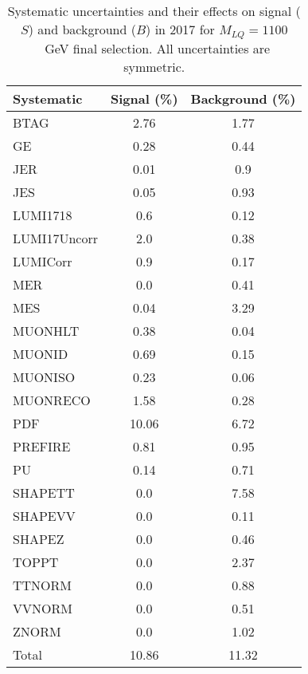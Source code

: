 \begin{table}[htbp]
\begin{center}
\caption{Systematic uncertainties and their effects on signal ($S$) and background ($B$) in 2017 for $M_{LQ}=1100$~GeV final selection. All uncertainties are symmetric.}
\begin{tabular}{lcc}
\hline\hline
Systematic & Signal (\%) & Background (\%) \\ \hline 
BTAG & 2.76 & 1.77\\ 
GE & 0.28 & 0.44\\ 
JER & 0.01 & 0.9\\ 
JES & 0.05 & 0.93\\ 
LUMI1718 & 0.6 & 0.12\\ 
LUMI17Uncorr & 2.0 & 0.38\\ 
LUMICorr & 0.9 & 0.17\\ 
MER & 0.0 & 0.41\\ 
MES & 0.04 & 3.29\\ 
MUONHLT & 0.38 & 0.04\\ 
MUONID & 0.69 & 0.15\\ 
MUONISO & 0.23 & 0.06\\ 
MUONRECO & 1.58 & 0.28\\ 
PDF & 10.06 & 6.72\\ 
PREFIRE & 0.81 & 0.95\\ 
PU & 0.14 & 0.71\\ 
SHAPETT & 0.0 & 7.58\\ 
SHAPEVV & 0.0 & 0.11\\ 
SHAPEZ & 0.0 & 0.46\\ 
TOPPT & 0.0 & 2.37\\ 
TTNORM & 0.0 & 0.88\\ 
VVNORM & 0.0 & 0.51\\ 
ZNORM & 0.0 & 1.02\\ 
Total & 10.86 & 11.32\\ \hline \hline
\end{tabular}
\label{tab:SysUncertainties_uujj_1100}
\end{center}
\end{table}


